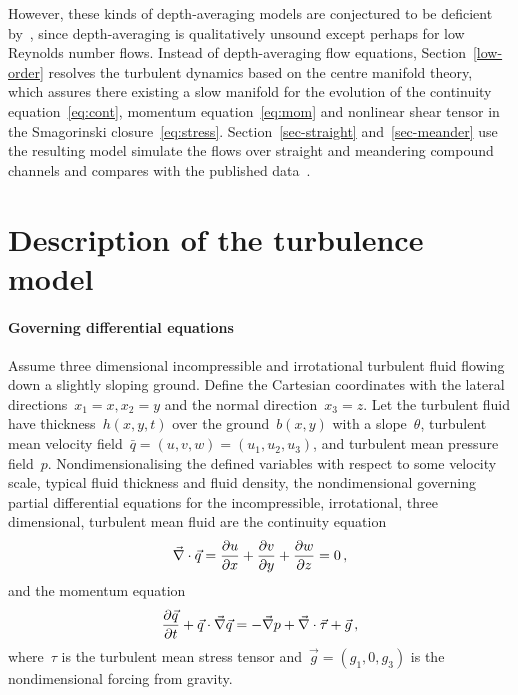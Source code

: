 \documentclass[12pt,a5paper]{article}
\begin{document}
However, these kinds of depth-averaging models are conjectured to be deficient by~\cite{Roberts1996}, since depth-averaging is qualitatively unsound except perhaps for low Reynolds number flows. Instead of depth-averaging flow equations, Section~\ref{low-order} resolves the turbulent dynamics based on the centre manifold theory, which assures there existing a slow manifold for the evolution of the continuity equation~\eqref{eq:cont}, momentum equation~\eqref{eq:mom} and nonlinear shear tensor in the Smagorinski closure~\eqref{eq:stress}.
Section~\ref{sec-straight} and~\ref{sec-meander} use the resulting model simulate the flows over straight and meandering compound channels and compares with the published data~\cite[e.g.]{Bousmar2002,Liu2009}.


\section{Description of the turbulence model}
\label{description}

\paragraph{Governing differential equations} Assume three dimensional incompressible and irrotational turbulent fluid flowing down a slightly sloping ground. Define the Cartesian coordinates with the lateral directions~$x_1=x, x_2=y$ and the normal direction~$x_3=z$. Let the turbulent fluid have thickness~$h(x,y,t)$ over the ground~$b(x,y)$ with a slope~$\theta$, turbulent mean velocity field~$\bar q=(u,v,w)=(u_1,u_2,u_3)$, and turbulent mean pressure field~$p$. Nondimensionalising the defined variables with respect to some velocity scale, typical fluid thickness and fluid density, the nondimensional governing partial differential equations for the incompressible, irrotational, three dimensional, turbulent mean fluid are the continuity equation
\begin{equation}
    \divv\vec q=\D xu+\D yv+\D zw=0\,,\label{eq:cont}
\end{equation}
and the momentum equation
\begin{equation}
    \D t{\vec q} +\vec q\cdot\grad\vec q
    =-\grad p +\divv\vec\tau +\vec{g}\,,\label{eq:mom}
\end{equation}
where~$\tau$ is the turbulent mean stress tensor and~$\vec g=(g_1,0,g_3)$ is the nondimensional forcing from gravity.
\end{document}
